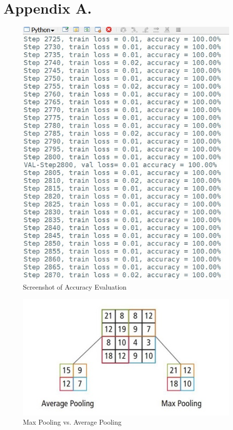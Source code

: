 \documentclass[twoside,11pt]{article}
\begin{document}



\newpage
\appendix
\section*{Appendix A.}
\begin{figure}[htbp]
\centering
\includegraphics[width=.8\textwidth]{figure7.jpg}
\caption{Screenshot of Accuracy Evaluation}
\label{figure1}
\end{figure}


\begin{figure}[htbp]
\centering
\includegraphics[width=.8\textwidth]{figure4.JPG}
\caption{Max Pooling vs. Average Pooling }
\label{figure1}
\end{figure}
\end{document}
